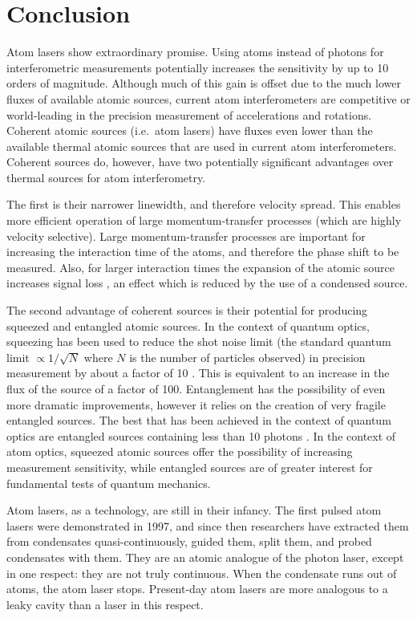 \chapter{Conclusion}
\label{Conclusion}
\graphicspath{{Figures/Conclusion/}{Figures/Common/}}

Atom lasers show extraordinary promise.  Using atoms instead of photons for interferometric measurements potentially increases the sensitivity by up to 10 orders of magnitude.  Although much of this gain is offset due to the much lower fluxes of available atomic sources, current atom interferometers are competitive or world-leading in the precision measurement of accelerations and rotations.  Coherent atomic sources (i.e.\ atom lasers) have fluxes even lower than the available thermal atomic sources that are used in current atom interferometers.  Coherent sources do, however, have two potentially significant advantages over thermal sources for atom interferometry.

The first is their narrower linewidth, and therefore velocity spread.  This enables more efficient operation of large momentum-transfer processes (which are highly velocity selective).  Large momentum-transfer processes are important for increasing the interaction time of the atoms, and therefore the phase shift to be measured.  Also, for larger interaction times the expansion of the atomic source increases signal loss \citep{Dimopoulos:2007uq}, an effect which is reduced by the use of a condensed source.

The second advantage of coherent sources is their potential for producing squeezed and entangled atomic sources.  In the context of quantum optics, squeezing has been used to reduce the shot noise limit (the standard quantum limit $\propto 1/\sqrt{N}$ where $N$ is the number of particles observed) in precision measurement by about a factor of 10 \citep{Vahlbruch:2008,Mehmet:2010}.  This is equivalent to an increase in the flux of the source of a factor of 100.  Entanglement has the possibility of even more dramatic improvements, however it relies on the creation of very fragile entangled sources.  The best that has been achieved in the context of quantum optics are entangled sources containing less than 10 photons \citep{Leibfried:2004}.  In the context of atom optics, squeezed atomic sources offer the possibility of increasing measurement sensitivity, while entangled sources are of greater interest for fundamental tests of quantum mechanics.

Atom lasers, as a technology, are still in their infancy.  The first pulsed atom lasers were demonstrated in 1997, and since then researchers have extracted them from condensates quasi-continuously, guided them, split them, and probed condensates with them.  They are an atomic analogue of the photon laser, except in one respect: they are not truly continuous.  When the condensate runs out of atoms, the atom laser stops.  Present-day atom lasers are more analogous to a leaky cavity than a laser in this respect.  

